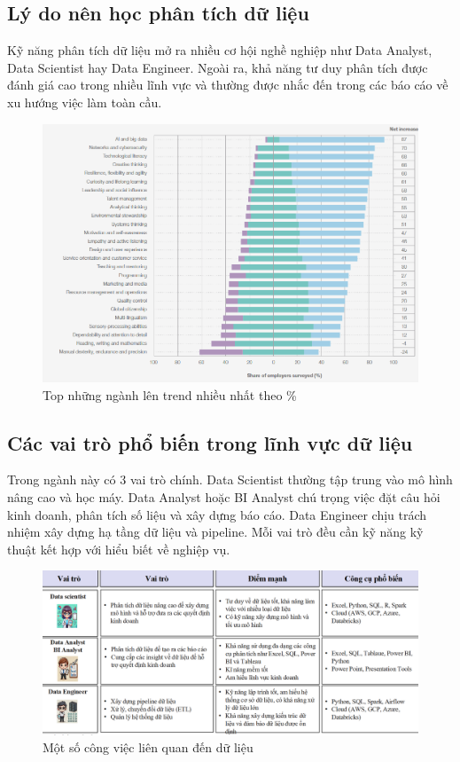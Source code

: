 \documentclass[11pt]{article}
\begin{document}
\subsection{Lý do nên học phân tích dữ liệu}
Kỹ năng phân tích dữ liệu mở ra nhiều cơ hội nghề nghiệp như Data Analyst, Data Scientist hay Data Engineer. Ngoài ra, khả năng tư duy phân tích được đánh giá cao trong nhiều lĩnh vực và thường được nhắc đến trong các báo cáo về xu hướng việc làm toàn cầu.

\begin{figure}[H]
    \centering
    \includegraphics[width=1\linewidth]{images/whyStudyDA.png}
    \caption{Top những ngành lên trend nhiều nhất theo \%}
    \label{fig:job increase 2025 in percent}
\end{figure}

\subsection{Các vai trò phổ biến trong lĩnh vực dữ liệu}
Trong ngành này có 3 vai trò chính. Data Scientist thường tập trung vào mô hình nâng cao và học máy. Data Analyst hoặc BI Analyst chú trọng việc đặt câu hỏi kinh doanh, phân tích số liệu và xây dựng báo cáo. Data Engineer chịu trách nhiệm xây dựng hạ tầng dữ liệu và pipeline. Mỗi vai trò đều cần kỹ năng kỹ thuật kết hợp với hiểu biết về nghiệp vụ.

\begin{figure}[H]
    \centering
    \includegraphics[width=1\linewidth]{images/jobs_in_dataAnalysis.png}
    \caption{Một số công việc liên quan đến dữ liệu}
    \label{fig:jobs_in_dataAnalysis}
\end{figure}
\end{document}
